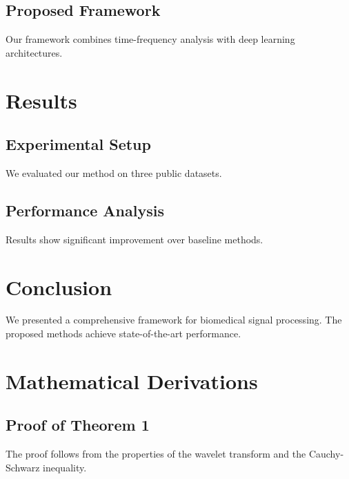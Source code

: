 \documentclass[12pt, a4paper]{report}
\begin{document}
\section{Proposed Framework}
Our framework combines time-frequency analysis with
deep learning architectures.

\chapter{Results}
\section{Experimental Setup}
We evaluated our method on three public datasets.

\section{Performance Analysis}
Results show significant improvement over baseline methods.

\chapter{Conclusion}
We presented a comprehensive framework for biomedical
signal processing. The proposed methods achieve
state-of-the-art performance.




\appendix
\chapter{Mathematical Derivations}
\section{Proof of Theorem 1}
The proof follows from the properties of the wavelet
transform and the Cauchy-Schwarz inequality.
\end{document}
